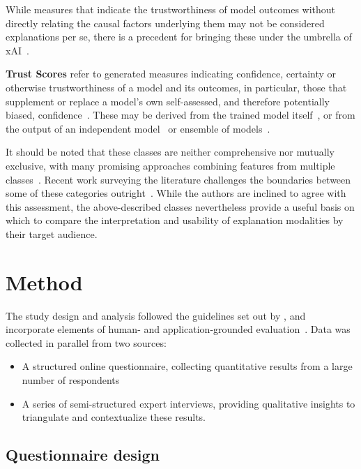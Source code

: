 \documentclass[final,5p,times,twocolumn,hyphens]{elsarticle}
\begin{document}
While measures that indicate the trustworthiness of model outcomes without directly relating the causal factors underlying them may not be considered explanations per se, there is a precedent for bringing these under the umbrella of xAI~\cite{poceviciute_survey_2020, lin2019explanations}.

\textbf{Trust Scores} refer to generated measures indicating confidence, certainty or otherwise trustworthiness of a model and its outcomes, in particular, those that supplement or replace a model's own self-assessed, and therefore potentially biased, confidence~\cite{jiang2018trust, wang2021ai}. These may be derived from the trained model itself~\cite{tagasovska2019single}, or from the output of an independent model~\cite{jiang2018trust} or ensemble of models~\cite{pearce2018high}.

It should be noted that these classes are neither comprehensive nor mutually exclusive, with many promising approaches combining features from multiple classes~\cite{kim2016examples,liu2019generative}. Recent work surveying the literature challenges the boundaries between some of these categories outright~\cite{zhang2021survey}. While the authors are inclined to agree with this assessment, the above-described classes nevertheless provide a useful basis on which to compare the interpretation and usability of explanation modalities by their target audience.

\section{Method}
\label{sec:method}

The study design and analysis followed the guidelines set out by \citet{runeson_guidelines_2008}, and incorporate elements of human- and application-grounded evaluation~\cite{doshi2017towards}. Data was collected in parallel from two sources:

\begin{itemize}
    \item A structured online questionnaire, collecting quantitative results from a large number of respondents
    \item A series of semi-structured expert interviews, providing qualitative insights to triangulate and contextualize these results. 
\end{itemize}

\subsection{Questionnaire design}
\end{document}
